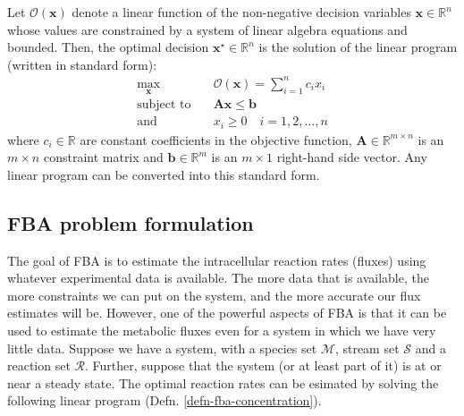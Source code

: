 \documentclass{article}[11pt]
\begin{document}
Let $\mathcal{O}(\mathbf{x})$ denote a linear function of the non-negative decision variables $\mathbf{x}\in\mathbb{R}^{n}$
whose values are constrained by a system of linear algebra equations and bounded. 
Then, the optimal decision $\mathbf{x}^{\star}\in\mathbb{R}^{n}$ is the solution of the linear program (written in standard form):
\begin{align*}
\max_{\mathbf{x}} &\quad \mathcal{O}(\mathbf{x}) = \sum_{i=1}^{n} c_{i}{x}_{i}\\
\text{subject to}&\quad\mathbf{A}\mathbf{x} \leq\mathbf{b}\\
\text{and} &\quad x_{i}\geq{0}\quad{i=1,2,\dots,n}
\end{align*}
where $c_{i}\in\mathbb{R}$ are constant coefficients in the objective function, $\mathbf{A}\in\mathbb{R}^{m\times{n}}$ 
is an $m\times{n}$ constraint matrix and $\mathbf{b}\in\mathbb{R}^{m}$ is an $m\times{1}$ right-hand side vector. 
Any linear program can be converted into this standard form.  

\subsection{FBA problem formulation}
The goal of FBA is to estimate the intracellular reaction rates (fluxes) using whatever experimental data is available.
The more data that is available, the more constraints we can put on the system, and the more accurate our flux estimates will be.
However, one of the powerful aspects of FBA is that it can be used to estimate the metabolic fluxes even for a system in which we have very little data.
Suppose we have a system, with a species set $\mathcal{M}$, stream set $\mathcal{S}$ and a reaction set $\mathcal{R}$. 
Further, suppose that the system (or at least part of it) is at or near a steady state. 
The optimal reaction rates can be esimated by solving the following linear program (Defn. \ref{defn-fba-concentration}).
\end{document}

